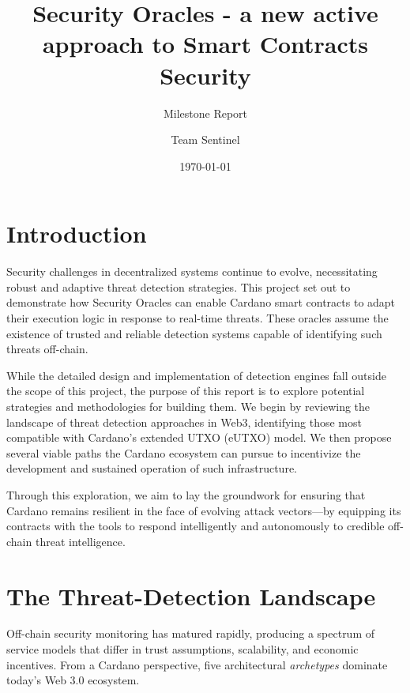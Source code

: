 \documentclass{scrreport}
\title{Security Oracles - a new active approach to Smart Contracts Security}
\subtitle{Milestone Report}
\author{Team Sentinel}
\date{\today}
\begin{document}
\maketitle

\tableofcontents

\newpage
\section{Introduction}
Security challenges in decentralized systems continue to evolve, necessitating robust and adaptive threat detection strategies. This project set out to demonstrate how Security Oracles can enable Cardano smart contracts to adapt their execution logic in response to real-time threats. These oracles assume the existence of trusted and reliable detection systems capable of identifying such threats off-chain.

While the detailed design and implementation of detection engines fall outside the scope of this project, the purpose of this report is to explore potential strategies and methodologies for building them. We begin by reviewing the landscape of threat detection approaches in Web3, identifying those most compatible with Cardano’s extended UTXO (eUTXO) model. We then propose several viable paths the Cardano ecosystem can pursue to incentivize the development and sustained operation of such infrastructure.

Through this exploration, we aim to lay the groundwork for ensuring that Cardano remains resilient in the face of evolving attack vectors—by equipping its contracts with the tools to respond intelligently and autonomously to credible off-chain threat intelligence.


\section{The Threat-Detection Landscape}
Off-chain security monitoring has matured rapidly, producing a spectrum of service models that differ
in trust assumptions, scalability, and economic incentives.  
From a Cardano perspective, five architectural \emph{archetypes} dominate today’s Web 3.0 ecosystem.
\end{document}
